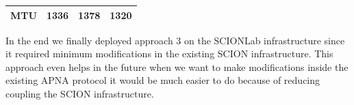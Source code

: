\begin{center}
\begin{table}[th!!]
\begin{tabular}{|c|c|c|c|}
\textbf{MTU}                                                               & 1336                                                                                                         & 1378                                                                                                      & 1320                                                                                                                                  \\ \hline
\end{tabular}
\end{table}
\end{center}
\egroup

In the end we finally deployed approach 3 on the SCIONLab infrastructure since it required minimum modifications in the existing SCION infrastructure. This approach even helps in the future when we want to make modifications inside the existing APNA protocol it would be much easier to do because of reducing coupling the SCION infrastructure. 